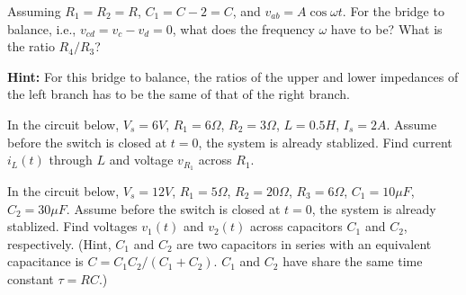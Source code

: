\begin{enumerate}

  Assuming $R_1=R_2=R$, $C_1=C-2=C$, and $v_{ab}=A\cos\omega t$. For the
  bridge to balance, i.e., $v_{cd}=v_c-v_d=0$, what does the frequency 
  $\omega$ have to be? What is the ratio $R_4/R_3$?

  {\bf Hint:} For this bridge to balance, the ratios of the upper and
  lower impedances of the left branch has to be the same of that of
  the right branch.



\end{enumerate}



\item In the circuit below, $V_s=6V$, $R_1=6\Omega$, $R_2=3\Omega$,
$L=0.5H$, $I_s=2A$. Assume before the switch is closed at $t=0$, the
system is already stablized. Find current $i_L(t)$ through $L$ and 
voltage $v_{R_1}$ across $R_1$.

% 
% 

\item In the circuit below, $V_s=12V$, $R_1=5\Omega$, $R_2=20\Omega$,
$R_3=6\Omega$, $C_1=10\mu F$, $C_2=30\mu F$. Assume before the switch 
is closed at $t=0$, the system is already stablized. Find voltages
$v_1(t)$ and $v_2(t)$ across capacitors $C_1$ and $C_2$, respectively.
(Hint, $C_1$ and $C_2$ are two capacitors in series with an equivalent
capacitance is $C=C_1 C_2/(C_1+C_2)$. $C_1$ and $C_2$ have share the same
time constant $\tau=RC$.)

